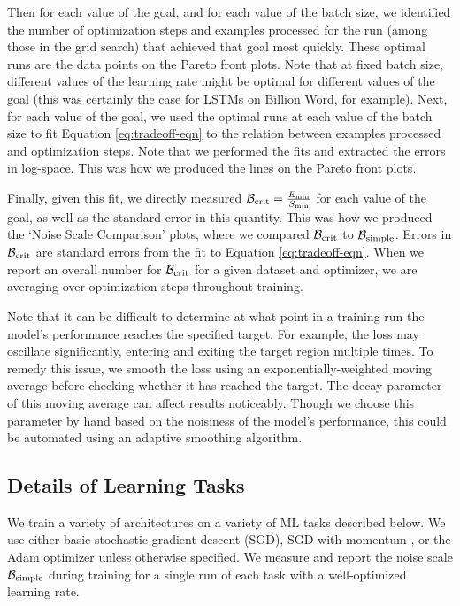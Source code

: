 \documentclass[english]{article}
\newcommand{\CB}{{\cal B}}
\begin{document}
Then for each  value of the goal, and for each value of the batch size, we identified the number of optimization steps and examples processed for the run (among those in the grid search) that achieved that goal most quickly.  These optimal runs are the data points on the Pareto front plots.  Note that at fixed batch size, different values of the learning rate might be optimal for different values of the goal (this was certainly the case for LSTMs on Billion Word, for example).  Next, for each value of the goal, we used the optimal runs at each value of the batch size to  fit Equation \ref{eq:tradeoff-eqn} to the relation between examples processed and optimization steps.  Note that we performed the fits and extracted the errors in log-space. This was how we produced the lines on the Pareto front plots.

Finally, given this fit, we directly measured $\CB_{\rm crit} = \frac{E_{\rm min}}{S_{\rm min}}$ for each value of the goal, as well as the standard error in this quantity.  This was how we produced the `Noise Scale Comparison' plots, where we compared $\CB_{\rm crit}$ to $\CB_{\rm simple}$.  Errors in $\CB_{\rm crit}$ are standard errors from the fit to Equation \ref{eq:tradeoff-eqn}.  When we report an overall number for $\CB_{\rm crit}$ for a given dataset and optimizer, we are averaging over optimization steps throughout training.

Note that it can be difficult to determine at what point in a training run the model's performance reaches the specified target.  For example, the loss may oscillate significantly, entering and exiting the target region multiple times.  To remedy this issue, we smooth the loss using an exponentially-weighted moving average before checking whether it has reached the target.  The decay parameter of this moving average can affect results noticeably. Though we choose this parameter by hand based on the noisiness of the model's performance, this could be automated using an adaptive smoothing algorithm.

\subsection{Details of Learning Tasks \label{sec:task-details}}

We train a variety of architectures on a variety of ML tasks described below. We use either basic stochastic gradient descent (SGD), SGD with momentum \cite{pmlr-v28-sutskever13}, or the Adam optimizer \cite{kingma2014adam} unless otherwise specified.  We measure and report the noise scale $\CB_{\rm simple}$ during training for a single run of each task with a well-optimized learning rate.
\end{document}
